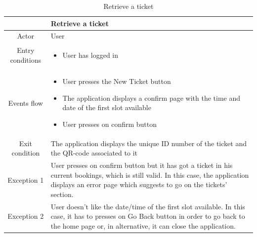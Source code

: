 \documentclass[table, 12pt]{article}
\begin{document}
\begin{longtable}{|c| p{10cm}|}
    \caption{Retrieve a ticket}                                                                                                                                                                                                 \\
    \hline
                     & Retrieve a ticket                                                                                                                                                                                        \\
    \hline
    Actor            & User                                                                                                                                                                                                     \\
    \hline
    Entry conditions & \begin{itemize}
        \item User has logged in
    \end{itemize}                                                                                                                                                                               \\
    \hline
    Events flow      & \begin{itemize}[nosep,after=\strut]
        \item User presses the New Ticket button
        \item The application displays a confirm page with the time and date of the first slot available
        \item User presses on confirm button
    \end{itemize}                                                                                                                                                                               \\
    \hline
    Exit condition   &
    The application displays the unique ID number of the ticket and the QR-code associated to it                                                                                                                                \\
    \hline
    \hline
    Exception 1      & User presses on confirm button but it has got a ticket in his current bookings, which is still valid. In this case, the application displays an error page which suggests to go on the tickets' section. \\
    \hline
    Exception 2      & User doesn't like the date/time of the first slot available. In this case, it has to presses on Go Back button in order to go back to the home page or, in alternative, it can close the application.    \\
    \hline
\end{longtable}
\end{document}
